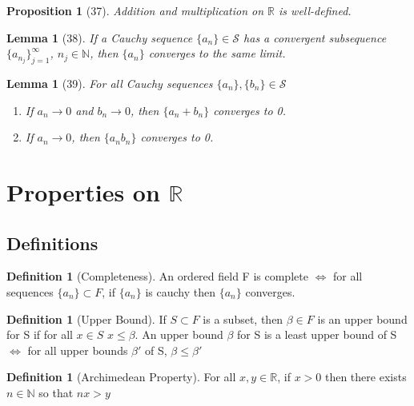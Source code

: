 \documentclass[12pt]{article}
\newtheorem{lem}[thm]{Lemma}  %
\newtheorem{prop}[thm]{Proposition}
\theoremstyle{definition}
\newtheorem{defn}[thm]{Definition}
\theoremstyle{remark}
\numberwithin{equation}{section}
\newcommand\R{\mathbb R}    %
\newcommand\N{\mathbb N}    %
\begin{document}
\begin{prop}[37]
        Addition and multiplication on $\R$ is well-defined.
\end{prop}



\begin{lem}[38]
        If a Cauchy sequence $\{a_n\} \in \mathcal{S}$ has a convergent subsequence $\{a_{n_j}\}_{j=1}^{\infty}$, $n_j \in \N$, then $\{a_n\}$ converges to the same limit.
\end{lem}



\begin{lem}[39]
        For all Cauchy sequences $\{a_n\},\{b_n\} \in \mathcal{S}$
        \begin{enumerate}
                \item If $a_n \rightarrow 0$ and $b_n \rightarrow 0$, then $\{a_n + b_n\}$ converges to 0.
                \item If $a_n \rightarrow 0$, then $\{a_nb_n\}$ converges to 0.
        \end{enumerate}
\end{lem}

\clearpage


\section{Properties on $\R$}



\subsection{Definitions}

\begin{defn}[Completeness]
        An ordered field F is complete $\iff$ for all sequences $\{a_n\} \subset F$, if $\{a_n\}$ is cauchy then $\{a_n\}$ converges.
\end{defn}


\begin{defn}[Upper Bound]
        If $S \subset F$ is a subset, then $\beta \in F$ is an upper bound for S if for all $x \in S$ $x \leq \beta$. An upper bound $\beta$ for S is a least upper bound of S $\iff$ for all upper bounds $\beta'$ of S, $\beta \leq \beta'$
\end{defn}



\begin{defn}[Archimedean Property]
        For all $x,y \in \R$, if $x > 0$ then there exists $n \in \N$ so that $nx > y$
\end{defn}
\end{document}
